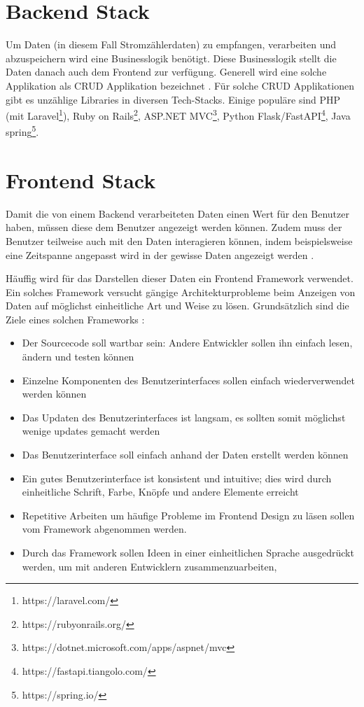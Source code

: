 \section{Backend Stack}
\label{state:backend}

Um Daten (in diesem Fall Stromzählerdaten) zu empfangen, verarbeiten und abzuspeichern
wird eine Businesslogik benötigt. Diese Businesslogik stellt die Daten
danach auch dem Frontend zur verfügung. Generell wird eine solche Applikation als \ac{CRUD} Applikation
bezeichnet \parencite{sulemani_2021} \parencite{johnston_2021}.
Für solche \ac{CRUD} Applikationen gibt es unzählige Libraries in diversen Tech-Stacks.
Einige populäre sind PHP (mit Laravel\footnote{https://laravel.com/}),
Ruby on Rails\footnote{https://rubyonrails.org/}, ASP.NET MVC\footnote{https://dotnet.microsoft.com/apps/aspnet/mvc},
Python Flask/FastAPI\footnote{https://fastapi.tiangolo.com/}, Java spring\footnote{https://spring.io/}.


\section{Frontend Stack}
\label{state:frontend}

Damit die von einem Backend verarbeiteten Daten einen Wert für den Benutzer haben, müssen diese
dem Benutzer angezeigt werden können. Zudem muss der Benutzer teilweise auch mit den
Daten interagieren können, indem beispielsweise eine Zeitspanne angepasst wird in
der gewisse Daten angezeigt werden \parencite{anokhina_2019}.

Häuffig wird für das Darstellen dieser Daten ein Frontend Framework verwendet.
Ein solches Framework versucht gängige Architekturprobleme beim Anzeigen von Daten auf möglichst einheitliche Art und Weise
zu lösen. Grundsätzlich sind die Ziele eines solchen Frameworks \parencite{do-i-need-a-frontend-fwk}:

\begin{itemize}
    \item Der Sourcecode soll wartbar sein: Andere Entwickler sollen ihn einfach lesen, ändern und testen können
    \item Einzelne Komponenten des Benutzerinterfaces sollen einfach wiederverwendet werden können
    \item Das Updaten des Benutzerinterfaces ist langsam, es sollten somit möglichst wenige updates gemacht werden
    \item Das Benutzerinterface soll einfach anhand der Daten erstellt werden können
    \item Ein gutes Benutzerinterface ist konsistent und intuitive; dies wird durch einheitliche Schrift, Farbe, Knöpfe und andere Elemente erreicht
    \item Repetitive Arbeiten um häufige Probleme im Frontend Design zu läsen sollen vom Framework abgenommen werden.
    \item Durch das Framework sollen Ideen in einer einheitlichen Sprache ausgedrückt werden, um mit anderen Entwicklern zusammenzuarbeiten,
\end{itemize}

